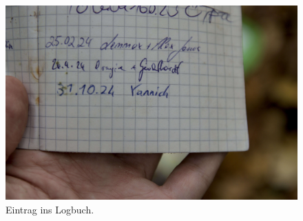 \begin{figure}[h]
    \centering
    \includegraphics[width=.7\linewidth]{figures/geocaching/second/IMG_3113.jpg}
    \caption{Eintrag ins Logbuch.}
    \label{second-cache-log}
\end{figure}